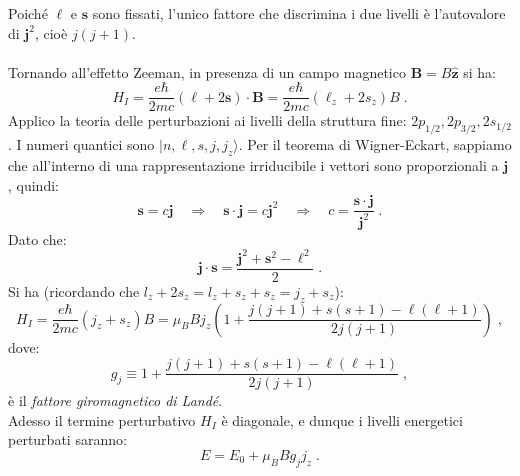 \documentclass[12pt,a4paper]{report}
\theoremstyle{definition}
\numberwithin{equation}{section}
\newcommand{\ket}{\rangle}
\begin{document}
Poiché $\boldsymbol{\ell}$ e $\mathbf{s}$ sono fissati, l'unico fattore che discrimina i due livelli è l'autovalore di $\mathbf{j}^2$, cioè $j(j+1)$. \\
\\
Tornando all'effetto Zeeman, in presenza di un campo magnetico $\mathbf{B}=B\hat{\mathbf{z}}$ si ha:
\begin{equation}
H_I=\frac{e\hbar}{2mc}(\boldsymbol{\ell}+2\mathbf{s})\cdot\mathbf{B}=\frac{e\hbar}{2mc}(\ell_z+2s_z)B\;.
\end{equation}
Applico la teoria delle perturbazioni ai livelli della struttura fine: $2p_{1/2},2p_{3/2},2s_{1/2}$. I numeri quantici sono $|n,\ell,s,j,j_z\ket$. Per il teorema di Wigner-Eckart, sappiamo che all'interno di una rappresentazione irriducibile i vettori sono proporzionali a $\mathbf{j}$, quindi:
\begin{equation}
\mathbf{s}=c\mathbf{j}\quad \Longrightarrow \quad \mathbf{s}\cdot\mathbf{j}=c\mathbf{j}^2\quad \Longrightarrow\quad c=\frac{\mathbf{s}\cdot\mathbf{j}}{\mathbf{j}^2}\;.
\end{equation}
Dato che:
\begin{equation}
\mathbf{j}\cdot\mathbf{s}=\frac{\mathbf{j}^2+\mathbf{s}^2-\boldsymbol{\ell}^2}{2}\;.
\end{equation}
Si ha (ricordando che $l_z+2s_z=l_z+s_z+s_z=j_z+s_z$):
\begin{equation}
H_I=\frac{e\hbar}{2mc}(j_z+s_z)B=\mu_BBj_z\left(1+\frac{j(j+1)+s(s+1)-\ell(\ell+1)}{2j(j+1)}\right)\;,
\end{equation}
dove:
\begin{equation}
g_j\equiv 1+\frac{j(j+1)+s(s+1)-\ell(\ell+1)}{2j(j+1)}\;,
\end{equation}
è il \textit{fattore giromagnetico di Landé}. \\
Adesso il termine perturbativo $H_I$ è diagonale, e dunque i livelli energetici perturbati saranno:
\begin{equation}
E=E_0+\mu_BBg_jj_z\;.
\end{equation}
\end{document}
